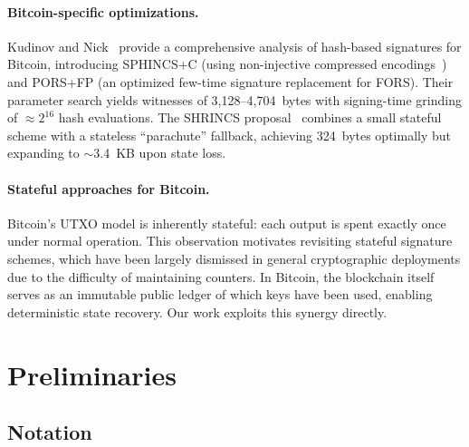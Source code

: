 \documentclass[11pt,a4paper]{article}
\theoremstyle{definition}
\begin{document}
\paragraph{Bitcoin-specific optimizations.} Kudinov and Nick~\cite{kudinov2025} provide a comprehensive analysis of hash-based signatures for Bitcoin, introducing SPHINCS+C (using non-injective compressed encodings~\cite{kudinov2022sphincsc}) and PORS+FP (an optimized few-time signature replacement for FORS). Their parameter search yields witnesses of 3,128--4,704~bytes with signing-time grinding of $\approx 2^{16}$ hash evaluations. The SHRINCS proposal~\cite{nick2025shrincs} combines a small stateful scheme with a stateless ``parachute'' fallback, achieving 324~bytes optimally but expanding to $\sim$3.4~KB upon state loss.

\paragraph{Stateful approaches for Bitcoin.} Bitcoin's UTXO model is inherently stateful: each output is spent exactly once under normal operation. This observation motivates revisiting stateful signature schemes, which have been largely dismissed in general cryptographic deployments due to the difficulty of maintaining counters. In Bitcoin, the blockchain itself serves as an immutable public ledger of which keys have been used, enabling deterministic state recovery. Our work exploits this synergy directly.

\section{Preliminaries}
\label{sec:prelim}

\subsection{Notation}
\label{sec:notation}
\end{document}
